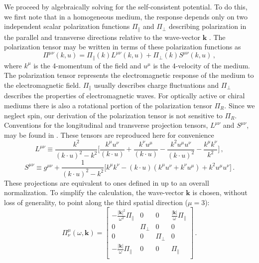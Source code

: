 We proceed by algebraically solving for the self-consistent potential. To do this, we first note that in a homogeneous medium, the response depends only on two independent scalar polarization functions $\Pi_\parallel$ and $\Pi_\perp$ describing polarization in the parallel and transverse directions relative to the wave-vector $\boldsymbol{k}$ \cite{Weldon:1982aq}. The polarization tensor may be written in terms of these polarization functions as
\begin{equation}\label{eq:poltensgen}
 \Pi^{\mu \nu}(k,u) = \Pi_\parallel(k) L^{\mu \nu}(k,u) + \Pi_\perp(k) S^{\mu \nu}(k,u)\,,
\end{equation}
where $k^\mu$ is the 4-momentum of the field and $u^\mu$ is the 4-velocity of the medium. The polarization tensor represents the electromagnetic response of the medium to the electromagnetic field. $\Pi_\parallel$ usually describes charge fluctuations and $\Pi_\perp$ describes the properties of electromagnetic waves. For optically active or chiral mediums there is also a rotational portion of the polarization tensor $\Pi_R$. Since we neglect spin, our derivation of the polarization tensor is not sensitive to $\Pi_R$. Conventions for the longitudinal and transverse projection tensors, $L^{\mu \nu}$ and  $S^{\mu \nu}$, may be found in \cite{melrose2008quantum}. These tensors are reproduced here for convenience
\begin{equation}
     L^{\mu \nu} \equiv \frac{k^2}{(k\cdot u)^2-k^2}\bigg[ \frac{ k^{\mu}u^{\nu}}{(k\cdot u)}+ \frac{ k^{\nu}u^{\mu}}{(k\cdot u)} -\frac{k^2u^{\mu}u^{\nu}}{(k\cdot u)^2}  -\frac{k^{\mu}k^{\nu}}{k^2} \bigg]\,,
\end{equation}
\begin{equation}
     S^{\mu \nu} \equiv g^{\mu \nu} +\frac{1}{(k\cdot u)^2-k^2}\bigg[ k^{\mu}k^{\nu} 
     -(k\cdot u)( k^{\mu}u^{\nu}+k^{\nu}u^{\mu})+k^2u^{\mu}u^{\nu}\bigg]\,.
\end{equation}
These projections are equivalent to ones defined in \cite{Weldon:1982aq} up to an overall normalization. To simplify the calculation, the wave-vector $\boldsymbol{k}$ is chosen, without loss of generality, to point along the third spatial direction ($\mu=3$):
 \begin{equation}\label{eq:poltenmat}
    \Pi^{\mu}_{\nu}(\omega,\boldsymbol{k}) = \left[
    \begin{array}{cccc}
-\frac{|\mathbf{k}|^2}{\omega^2}\Pi_{\parallel}& 0 & 0 & \frac{|\mathbf{k}|}{\omega}\Pi_{\parallel} \\
 0 & \Pi_{\perp} & 0 & 0 \\
 0 & 0 & \Pi_{\perp} & 0 \\
 -\frac{|\mathbf{k}|}{\omega}\Pi_{\parallel} & 0 & 0 & \Pi_{\parallel} \\ 
\end{array}
\right]\,.
\end{equation}
